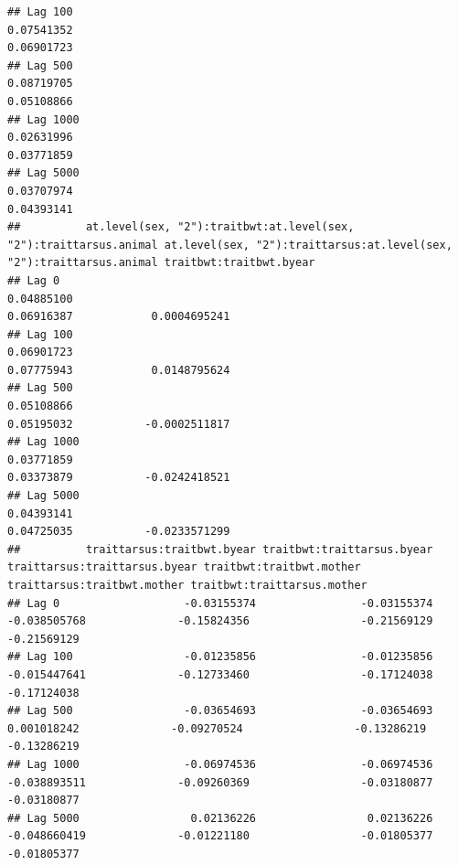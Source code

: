 \documentclass[
  12pt,
]{book}
\begin{document}
\begin{verbatim}
## Lag 100                                                      0.07541352                                                        0.06901723
## Lag 500                                                      0.08719705                                                        0.05108866
## Lag 1000                                                     0.02631996                                                        0.03771859
## Lag 5000                                                     0.03707974                                                        0.04393141
##          at.level(sex, "2"):traitbwt:at.level(sex, "2"):traittarsus.animal at.level(sex, "2"):traittarsus:at.level(sex, "2"):traittarsus.animal traitbwt:traitbwt.byear
## Lag 0                                                           0.04885100                                                           0.06916387            0.0004695241
## Lag 100                                                         0.06901723                                                           0.07775943            0.0148795624
## Lag 500                                                         0.05108866                                                           0.05195032           -0.0002511817
## Lag 1000                                                        0.03771859                                                           0.03373879           -0.0242418521
## Lag 5000                                                        0.04393141                                                           0.04725035           -0.0233571299
##          traittarsus:traitbwt.byear traitbwt:traittarsus.byear traittarsus:traittarsus.byear traitbwt:traitbwt.mother traittarsus:traitbwt.mother traitbwt:traittarsus.mother
## Lag 0                   -0.03155374                -0.03155374                  -0.038505768              -0.15824356                 -0.21569129                 -0.21569129
## Lag 100                 -0.01235856                -0.01235856                  -0.015447641              -0.12733460                 -0.17124038                 -0.17124038
## Lag 500                 -0.03654693                -0.03654693                   0.001018242              -0.09270524                 -0.13286219                 -0.13286219
## Lag 1000                -0.06974536                -0.06974536                  -0.038893511              -0.09260369                 -0.03180877                 -0.03180877
## Lag 5000                 0.02136226                 0.02136226                  -0.048660419              -0.01221180                 -0.01805377                 -0.01805377

\end{verbatim}
\end{document}
